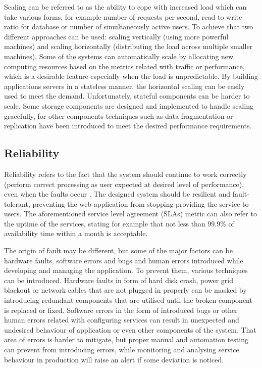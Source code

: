 Scaling can be referred to as the ability to cope with increased load which can take various forms, for example number of requests per second, read to write ratio for database or number of simultaneously active users. To achieve that two different approaches can be used: scaling vertically (using more powerful machines) and scaling horizontally (distributing the load across multiple smaller machines). Some of the systems can automatically scale by allocating new computing resources based on the metrics related with traffic or performance, which is a desirable feature especially when the load is unpredictable. By building applications servers in a stateless manner, the horizontal scaling can be easily used to meet the demand. Unfortunately, stateful components can be harder to scale. Some storage components are designed and implemented to handle scaling gracefully, for other components techniques such as data fragmentation or replication have been introduced to meet the desired performance requirements.

\subsection*{Reliability}

Reliability refers to the fact that the system should continue to work correctly (perform correct processing as user expected at desired level of performance), even when the faults occur \cite{DesignDataIntensiveApplications}. The designed system should be resilient and fault-tolerant, preventing the web application from stopping providing the service to users. The aforementioned service level agreement (SLAs) metric can also refer to the uptime of the services, stating for example that not less than 99.9\% of availability time within a month is acceptable.

The origin of fault may be different, but some of the major factors can be hardware faults, software errors and bugs and human errors introduced while developing and managing the application. To prevent them, various techniques can be introduced. Hardware faults in form of hard disk crash, power grid blackout or network cables that are not plugged in properly can be masked by introducing redundant components that are utilised until the broken component is replaced or fixed. Software errors in the form of introduced bugs or other human errors related with configuring services can result in unexpected and undesired behaviour of application or even other components of the system. That area of errors is harder to mitigate, but proper manual and automation testing can prevent from introducing errors, while monitoring and analysing service behaviour in production will raise an alert if some deviation is noticed.

